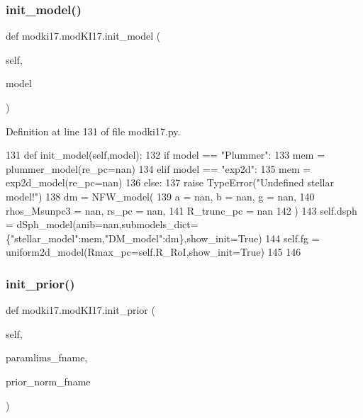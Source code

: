 \subsubsection{\texorpdfstring{init\+\_\+model()}{init\_model()}}
{\footnotesize\ttfamily def modki17.\+mod\+K\+I17.\+init\+\_\+model (\begin{DoxyParamCaption}\item[{}]{self,  }\item[{}]{model }\end{DoxyParamCaption})}



Definition at line 131 of file modki17.\+py.


\begin{DoxyCode}
131     \textcolor{keyword}{def }init\_model(self,model):
132         \textcolor{keywordflow}{if} model == \textcolor{stringliteral}{"Plummer"}:
133             mem = plummer\_model(re\_pc=nan)
134         \textcolor{keywordflow}{elif} model == \textcolor{stringliteral}{"exp2d"}:
135             mem = exp2d\_model(re\_pc=nan)
136         \textcolor{keywordflow}{else}: 
137             \textcolor{keywordflow}{raise} TypeError(\textcolor{stringliteral}{"Undefined stellar model!"})
138         dm = NFW\_model(
139             a = nan, b = nan, g = nan,
140             rhos\_Msunpc3 = nan, rs\_pc = nan,
141             R\_trunc\_pc = nan
142         )
143         self.dsph = dSph\_model(anib=nan,submodels\_dict=\{\textcolor{stringliteral}{"stellar\_model"}:mem,\textcolor{stringliteral}{"DM\_model"}:dm\},show\_init=\textcolor{keyword}{True})
144         self.fg = uniform2d\_model(Rmax\_pc=self.R\_RoI,show\_init=\textcolor{keyword}{True})
145     
146     
\end{DoxyCode}
\mbox{\label{classmodki17_1_1modKI17_a4cf4f61966d19271b648997a58979955}} 
\subsubsection{\texorpdfstring{init\+\_\+prior()}{init\_prior()}}
{\footnotesize\ttfamily def modki17.\+mod\+K\+I17.\+init\+\_\+prior (\begin{DoxyParamCaption}\item[{}]{self,  }\item[{}]{paramlims\+\_\+fname,  }\item[{}]{prior\+\_\+norm\+\_\+fname }\end{DoxyParamCaption})}



